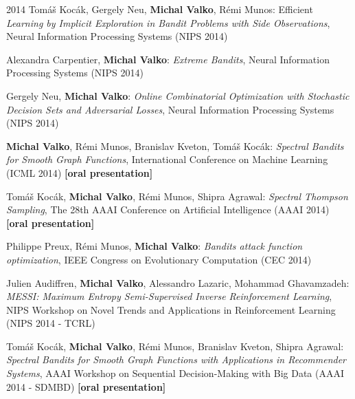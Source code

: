 \documentclass{resume}
\begin{document}
\begin{category}{2014}
\citembullet
Tom\'a\v s Koc\' ak, Gergely Neu, {\bf Michal Valko}, R\' emi Munos: Efficient 
\emph{Learning by Implicit Exploration in Bandit Problems with Side 
Observations}, Neural Information Processing Systems ({\sf NIPS 2014})

\citembullet
Alexandra Carpentier, {\bf Michal Valko}: \emph{Extreme Bandits},
Neural Information Processing Systems ({\sf NIPS 2014})

\citembullet
Gergely Neu, {\bf Michal Valko}: \emph{Online Combinatorial Optimization with 
Stochastic Decision Sets and Adversarial Losses}, Neural Information 
Processing Systems ({\sf NIPS 2014})

\citembullet
{\bf Michal Valko}, R\' emi Munos, Branislav Kveton, Tom\'a\v s Koc\' ak:
\emph{Spectral Bandits for Smooth Graph Functions},
International Conference on Machine Learning
({\sf ICML 2014}) {\bf [oral presentation]}

\citembullet
Tom\'a\v s Koc\' ak, {\bf Michal Valko},  R\' emi Munos, Shipra Agrawal:
\emph{Spectral Thompson Sampling},
 The 28th AAAI Conference on Artificial Intelligence 
({\sf AAAI 2014}) {\bf [oral presentation]}

\citembullet
Philippe Preux, R\' emi Munos, {\bf Michal Valko}:
\emph{Bandits attack function optimization},
IEEE Congress on Evolutionary Computation
({\sf CEC 2014}) 

\citembullet
Julien Audiffren, {\bf Michal Valko},  Alessandro Lazaric, Mohammad Ghavamzadeh:
\emph{MESSI: Maximum Entropy Semi-Supervised Inverse Reinforcement Learning},
 NIPS Workshop on Novel Trends and Applications in Reinforcement Learning
({\sf NIPS 2014 - TCRL}) 


\citembullet
Tom\'a\v s Koc\' ak, {\bf Michal Valko},  R\' emi Munos, Branislav Kveton, 
Shipra Agrawal:
\emph{Spectral Bandits for Smooth Graph Functions with Applications in 
Recommender Systems},
 AAAI Workshop on Sequential Decision-Making with Big Data 
({\sf AAAI 2014 - SDMBD}) {\bf [oral presentation]}



\end{category}
\end{document}
